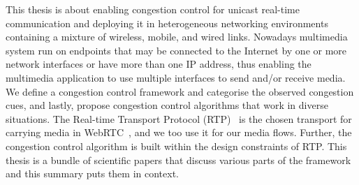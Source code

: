 This thesis is about enabling congestion control for unicast real-time
communication and deploying it in heterogeneous networking environments
containing a mixture of wireless, mobile, and wired links. Nowadays multimedia system
run on endpoints that may be connected to the Internet by one or more network
interfaces or have more  than one IP address, thus enabling the multimedia
application to use multiple interfaces to send and/or receive media.  We
define a congestion control framework and categorise the observed congestion
cues, and lastly, propose congestion control algorithms that work in diverse
situations. The Real-time Transport Protocol (RTP)~\cite{rfc3550} is the
chosen transport for carrying media in WebRTC~\cite{draft.rtcweb.transport},
and we too use it for our media flows. Further, the congestion control
algorithm is built within the design constraints of RTP. This thesis is a
bundle of scientific papers that  discuss various parts of the framework and
this summary puts them in context.





